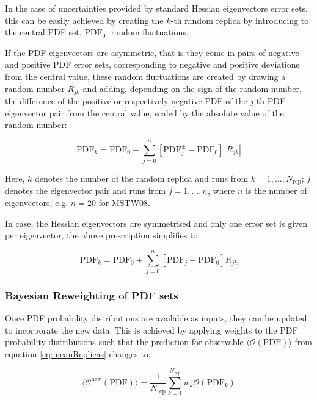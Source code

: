 \documentclass[11pt,a4paper]{article}
\begin{document}
In the case of uncertainties provided by standard Hessian eigenvectors error sets, this can be easily achieved by creating the $k$-th random replica by introducing to the central PDF set, $\mathrm{PDF}_0$, random fluctuations. 

If the PDF eigenvectors are asymmetric, that is they come in pairs of negative and positive PDF error sets, corresponding to negative and positive deviations from the central value, these random fluctuations are created by drawing a random number $R_{jk}$ and adding, depending on the sign of the random number, the difference of the positive or respectively negative PDF of the $j$-th PDF eigenvector pair from the central value, scaled by the absolute value of the random number:

\begin{equation}
 \mathrm{PDF}_k = \mathrm{PDF}_0  + \sum_{j=0}^{n} \left[ \mathrm{PDF}^{\pm}_j - \mathrm{PDF}_0 \right] |R_{jk}|
\end{equation}
 
Here, $k$ denotes the number of the random replica and runs from $k=1, ... , N_\mathrm{rep}$; $j$ denotes the eigenvector pair and runs from $j=1, ..., n$, where $n$ is the number of eigenvectors, e.g. $n=20$ for MSTW08. 

In case, the Hessian eigenvectors are symmetrised and only one error set is given per eigenvector, the above prescription simplifies to:
   
\begin{equation}
 \mathrm{PDF}_k = \mathrm{PDF}_0  + \sum_{j=0}^{n} \left[ \mathrm{PDF}_j - \mathrm{PDF}_0 \right] R_{jk}
\end{equation}

\subsubsection{Bayesian Reweighting of PDF sets}

Once PDF probability distributions are available as inputs, they can be updated to incorporate the new data. This is achieved by applying weights to the PDF probability distributions such that the prediction for observable $\langle\mathcal{O}(\mathrm{PDF})\rangle$ from equation \ref{eq:meanReplicas} changes to:

\begin{equation}
 \langle\mathcal{O}^{\mathrm{new}}(\mathrm{PDF})\rangle = \frac{1}{N_{\mathrm{rep}}} \sum_{k=1}^{N_{\mathrm{rep}}} w_k \mathcal{O}(\mathrm{PDF}_k)
\end{equation}
\end{document}

